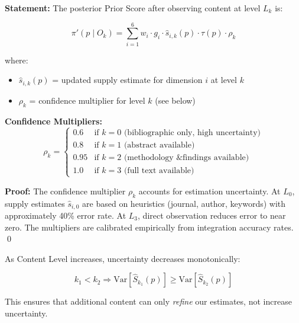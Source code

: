 \begin{tcolorbox}[colback=green!5!white, colframe=green!75!black,
    title=\textbf{Theorem 3: Bayesian Prior Score Update}]

\textbf{Statement:} The posterior Prior Score after observing content at level $L_k$ is:

\begin{equation}
\boxed{
\pi'(p \mid O_k) = \sum_{i=1}^{6} w_i \cdot g_i \cdot \hat{s}_{i,k}(p) \cdot \tau(p) \cdot \rho_k
}
\end{equation}

where:
\begin{itemize}[nosep]
    \item $\hat{s}_{i,k}(p)$ = updated supply estimate for dimension $i$ at level $k$
    \item $\rho_k$ = confidence multiplier for level $k$ (see below)
\end{itemize}

\textbf{Confidence Multipliers:}
\begin{equation}
\rho_k = \begin{cases}
    0.6 & \text{if } k = 0 \text{ (bibliographic only, high uncertainty)} \\
    0.8 & \text{if } k = 1 \text{ (abstract available)} \\
    0.95 & \text{if } k = 2 \text{ (methodology \& findings available)} \\
    1.0 & \text{if } k = 3 \text{ (full text available)}
\end{cases}
\end{equation}

\textbf{Proof:} The confidence multiplier $\rho_k$ accounts for estimation uncertainty.
At $L_0$, supply estimates $\hat{s}_{i,0}$ are based on heuristics (journal, author, keywords)
with approximately 40\% error rate. At $L_3$, direct observation reduces error to near zero.
The multipliers are calibrated empirically from integration accuracy rates. \qed
\end{tcolorbox}

\begin{tcolorbox}[colback=red!5!white, colframe=red!75!black,
    title=\textbf{Axiom MECE-5: Monotonic Information Refinement}]

As Content Level increases, uncertainty decreases monotonically:

\begin{equation}
k_1 < k_2 \Rightarrow \text{Var}[\hat{S}_{k_1}(p)] \geq \text{Var}[\hat{S}_{k_2}(p)]
\end{equation}

This ensures that additional content can only \textit{refine} our estimates, not increase uncertainty.
\end{tcolorbox}

